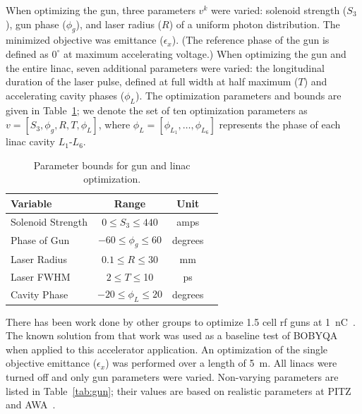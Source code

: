 When optimizing the gun, three parameters $v^k$ were varied: 
solenoid strength ($S_3$), gun phase ($\phi_g$), 
and laser radius ($R$) of a uniform photon distribution. 
The minimized objective was emittance ($\epsilon_x$).
(The reference phase of the gun is defined as $0^{\circ}$ at maximum accelerating voltage.) 
When optimizing the gun and the entire linac, seven additional parameters were 
varied: the longitudinal duration of the laser pulse, defined at full width at half maximum ($T$)
and accelerating cavity phases ($\phi_L$). The optimization parameters and
bounds are given in Table~\ref{tab:parameters}; we denote the set of
ten optimization parameters as $v=[S_3, \phi_g, R, T, \phi_L]$, where 
$\phi_L=[\phi_{L_1},\ldots,\phi_{L_6}]$ represents the phase of each linac cavity $L_1$-$L_6$. 
\begin{table}
	\caption{\label{tab:parameters} Parameter bounds for gun and linac optimization.}
	\begin{center}
		\begin{tabular}{ l *{3}{c}} 
			\toprule
			\textbf{Variable} & \textbf{Range} & \textbf{Unit} \\
			\midrule
			Solenoid Strength & $ 0 \le S_3 \le 440$  & amps \\
			Phase of Gun & $-60 \le \phi_g \le 60$  & degrees \\
			Laser Radius  & $0.1 \le R \le 30$  & mm \\
			Laser FWHM & $2 \le T \le $10  & ps \\
			Cavity Phase  & $-20 \le \phi_L \le 20$  & degrees \\
			\bottomrule	
		\end{tabular}
	\end{center}
\end{table}


 \label{sec:gunbobyqa}
There has been work done by other groups to optimize 1.5 cell rf guns
at \SI{1}{nC}~\cite{pitz}. The known solution from that work was used as 
a baseline test of BOBYQA when applied to this accelerator application.
An optimization of the single objective emittance ($\epsilon_x$) was 
performed over a length of \SI{5}{m}. 
All linacs were turned off and only gun parameters were varied. 
Non-varying parameters are listed in Table~\ref{tab:gun}; 
their values are based on realistic parameters at PITZ and AWA~\cite{pitz, benchmark}.

